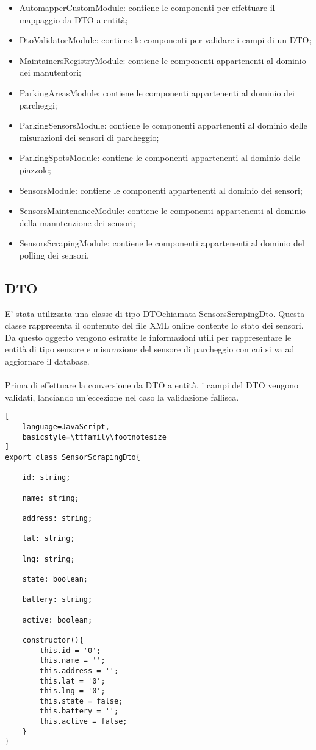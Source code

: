 \begin{itemize}
    \item AutomapperCustomModule: contiene le componenti per effettuare il mappaggio da DTO a entità;
    \item DtoValidatorModule: contiene le componenti per validare i campi di un DTO;
    \item MaintainersRegistryModule: contiene le componenti appartenenti al dominio dei manutentori;
    \item ParkingAreasModule: contiene le componenti appartenenti al dominio dei parcheggi;
    \item ParkingSensorsModule: contiene le componenti appartenenti al dominio delle misurazioni dei sensori di parcheggio;
    \item ParkingSpotsModule: contiene le componenti appartenenti al dominio delle piazzole;
    \item SensorsModule: contiene le componenti appartenenti al dominio dei sensori;
    \item SensorsMaintenanceModule: contiene le componenti appartenenti al dominio della manutenzione dei sensori;
    \item SensorsScrapingModule: contiene le componenti appartenenti al dominio del polling dei sensori.
\end{itemize}

\subsection{DTO}
E' stata utilizzata una classe di tipo \gls{DTO}\glsfirstoccur chiamata SensorsScrapingDto. Questa classe rappresenta
il contenuto del file \gls{XML} online contente lo stato dei sensori. Da questo oggetto vengono estratte le informazioni
utili per rappresentare le entità di tipo sensore e misurazione del sensore di parcheggio con cui si va ad aggiornare il database.
\\\\
Prima di effettuare la conversione da \gls{DTO} a entità, i campi del \gls{DTO} vengono validati, lanciando un'eccezione nel caso 
la validazione fallisca.
\\
\begin{lstlisting}[
    language=JavaScript,
    basicstyle=\ttfamily\footnotesize
]
export class SensorScrapingDto{
    
    id: string;

    name: string;

    address: string;

    lat: string;

    lng: string;

    state: boolean;

    battery: string;

    active: boolean;

    constructor(){
        this.id = '0';
        this.name = '';
        this.address = '';
        this.lat = '0';
        this.lng = '0';
        this.state = false;
        this.battery = '';
        this.active = false;
    }
}
\end{lstlisting}


